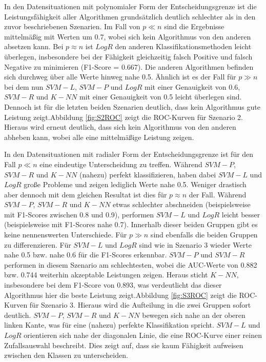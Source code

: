 \documentclass[
]{article}
\begin{document}
In den Datensituationen mit polynomialer Form der Entscheidungsgrenze
ist die Leistungsfähigkeit aller Algorithmen grundsätzlich deutlich
schlechter als in den zuvor beschriebenen Szenarien. Im Fall von
\(p \ll n\) sind die Ergebnisse mittelmäßig mit Werten um 0.7, wobei
sich kein Algorithmus von den anderen absetzen kann. Bei \(p \approx n\)
ist \(LogR\) den anderen Klassifikationsmethoden leicht überlegen,
insbesondere bei der Fähigkeit gleichzeitig falsch Positive und falsch
Negative zu minimieren (F1-Score = 0.667). Die anderen Algorithmen
befinden sich durchweg über alle Werte hinweg nahe 0.5. Ähnlich ist es
der Fall für \(p \gg n\) bei dem nun \(SVM-L\), \(SVM-P\) und \(LogR\)
mit einer Genauigkeit von 0.6, \(SVM-R\) und \(K-NN\) mit einer
Genauigkeit von 0.5 leicht überlegen sind. Dennoch ist für die letzten
beiden Szenarien deutlich, dass kein Algorithmus gute Leistung
zeigt.\newline Abbildung \ref{fig:S2ROC} zeigt die ROC-Kurven für
Szenario 2. Hieraus wird erneut deutlich, dass sich kein Algorithmus von
den anderen abheben kann, wobei alle eine mittelmäßige Leistung zeigen.

In den Datensituationen mit radialer Form der Entscheidungsgrenze ist
für den Fall \(p \ll n\) eine eindeutige Unterscheidung zu treffen.
Während \(SVM-P\), \(SVM-R\) und \(K-NN\) (nahezu) perfekt
klassifizieren, haben dabei \(SVM-L\) und \(LogR\) große Probleme und
zeigen lediglich Werte nahe 0.5. Weniger drastisch aber dennoch mit dem
gleichen Resultat ist dies für \(p \approx n\) der Fall. Während
\(SVM-P\), \(SVM-R\) und \(K-NN\) etwas schlechter abschneiden
(beispielsweise mit F1-Scores zwischen 0.8 und 0.9), performen \(SVM-L\)
und \(LogR\) leicht besser (beispielsweise mit F1-Scores nahe 0.7).
Innerhalb dieser beiden Gruppen gibt es keine nennenswerten
Unterschiede. Für \(p \gg n\) sind ebenfalls die beiden Gruppen zu
differenzieren. Für \(SVM-L\) und \(LogR\) sind wie in Szenario 3 wieder
Werte nahe 0.5 bzw. nahe 0.6 für die F1-Scores erkennbar. \(SVM-P\) und
\(SVM-R\) performen in diesem Szenario am schlechtesten, wobei die
AUC-Werte von 0.882 bzw. 0.744 weiterhin akzeptable Leistungen zeigen.
Heraus sticht \(K-NN\), insbesondere bei dem F1-Score von 0.893, was
verdeutlicht das dieser Algorithmus hier die beste Leistung
zeigt.\newline Abbildung \ref{fig:S3ROC} zeigt die ROC-Kurven für
Szenario 3. Hieraus wird die Aufteilung in die zwei Gruppen sofort
deutlich. \(SVM-P\), \(SVM-R\) und \(K-NN\) bewegen sich nahe an der
oberen linken Kante, was für eine (nahezu) perfekte Klassifikation
spricht. \(SVM-L\) und \(LogR\) orientieren sich nahe der diagonalen
Linie, die eine ROC-Kurve einer reinen Zufallsauswahl beschreibt. Dies
zeigt auf, dass sie kaum Fähigkeit aufweisen zwischen den Klassen zu
unterscheiden.
\end{document}
